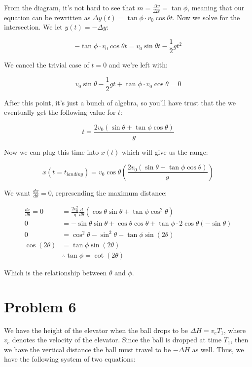 \documentclass{article}
\theoremstyle{definition}
\numberwithin{equation}{section}
\numberwithin{definition}{section}
\begin{document}
	
	From the diagram, it's not hard to see that $m = \frac{\Delta y}{\Delta x} = \tan \phi$, meaning that our equation can be rewritten as $\Delta y(t) = \tan \phi \cdot v_0\cos\theta t$. Now we solve for the intersection. We let $y(t) = -\Delta y$:
	
	\[-\tan \phi \cdot v_0\cos \theta t = v_0\sin \theta t - \frac{1}{2} gt^2\]
	
	We cancel the trivial case of $t = 0$ and we're left with:
	
	\[ v_0 \sin\theta - \frac{1}{2} gt + \tan \phi \cdot v_0\cos\theta = 0\]
	
	After this point, it's just a bunch of algebra, so you'll have trust that the we eventually get the following value for $t$:
	
	\[ t = \frac{2v_0(\sin \theta + \tan \phi \cos\theta)}{g}\]
	
	Now we can plug this time into $x(t)$ which will give us the range: 
	
	\[ x(t = t_{landing}) = v_0\cos\theta \left(\frac{2v_0(\sin \theta + \tan \phi \cos \theta)}{g}\right)\]
	
	We want $\frac{dx}{d\theta} = 0$, represending the maximum distance:
	
	\begin{align*}
		\frac{dx}{d\theta} = 0 &= \frac{2v_0^2}{g} \frac{d}{d\theta}(\cos \theta \sin \theta + \tan \phi \cos^2 \theta)\\
		0 &= -\sin \theta \sin \theta + \cos \theta \cos \theta + \tan \phi \cdot 2 \cos \theta (-\sin \theta)\\
		0 &= \cos^2 \theta - \sin^2\theta - \tan \phi \sin (2\theta)\\
		\cos (2\theta) &=	\tan \phi \sin(2\theta) \\
		&\therefore \boxed{\tan \phi = \cot(2\theta)}
		\end{align*}
	
	Which is the relationship between $\theta$ and $\phi$.
	
	\section{Problem 6}
	
	We have the height of the elevator when the ball drops to be $\Delta H = v_eT_1$, where $v_e$ denotes the velocity of the elevator. Since the ball is dropped at time $T_1$, then we have the vertical distance the ball must travel to be $-\Delta H$ as well. Thus, we have the following system of two equations:
	
\end{document}
